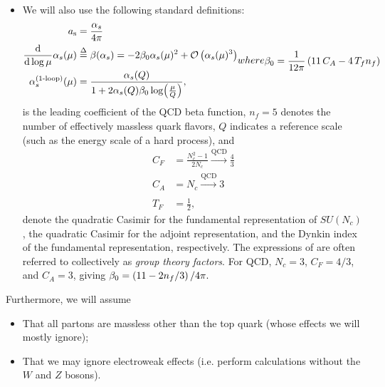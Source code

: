 \begin{itemize}
    \item
        We will also use the following standard definitions:
        \begin{subequations}
        \label{eq:qcd_coupling}
        \begin{align}
            \label{eq:as_defn}
            \as &= \frac{\alpha_s}{4\pi}
            \\
            \label{eq:beta_fn_defn}
            \frac{\dd}{\dd\log\mu}\alpha_s(\mu)
            &\eqdelta
            \beta(\alpha_s)
            =
            -2\beta_0 \alpha_s(\mu)^2 + \mathcal{O}\le(\alpha_s(\mu)^3\ri)
            \\
            \label{eq:alphas_1loop}
            \alpha_s^\text{(1-loop)}(\mu)
            &=
            \frac{\alpha_s(Q)}{1 + 2\alpha_s(Q) \beta_0 \log(\frac{\mu}{Q})}
            ,
        \end{align}
        where
        \begin{align}
            \beta_0 = \frac{1}{12\pi}\le(11\,C_A - 4\,T_f n_f\ri)
        \end{align}
        \end{subequations}
        is the leading coefficient of the QCD beta function, \(n_f = 5\) denotes the number of effectively massless quark flavors, \(Q\) indicates a reference scale (such as the energy scale of a hard process), and
        \begin{subequations}
        \label{eq:group_theory}
        \begin{align}
            C_F &= \frac{N_c^2 - 1}{2N_c}
            \xrightarrow[]{\text{QCD}}
            \frac{4}{3}
            \\
            C_A &= N_c
            \xrightarrow[]{\text{QCD}}
            3
            \\
            T_F &= \frac{1}{2}
            ,
        \end{align}
        \end{subequations}
        denote the quadratic Casimir for the fundamental representation of \(SU(N_c)\), the quadratic Casimir for the adjoint representation, and the Dynkin index of the fundamental representation, respectively.
        The expressions of  are often referred to collectively as \textit{group theory factors}.
        For QCD, \(N_c = 3\), \(C_F = 4/3\), and \(C_A = 3\), giving \(
            \beta_0 = \left(11 - 2 n_f / 3\right)/4\pi
            .
        \)
\end{itemize}


Furthermore, we will assume
\begin{itemize}
    \item
    That all partons are massless other than the top quark (whose effects we will mostly ignore);

    \item
    That we may ignore electroweak effects (i.e. perform calculations without the \(W\) and \(Z\) bosons).
\end{itemize}
